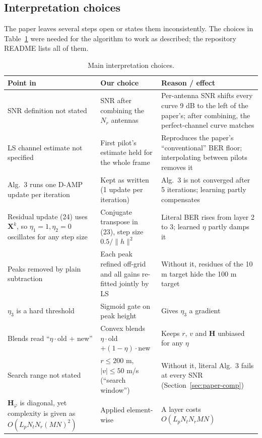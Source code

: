 \documentclass[11pt,a4paper]{article}
\newcommand{\BH}{\mathbf{H}}
\newcommand{\BX}{\mathbf{X}}
\begin{document}
\subsection{Interpretation choices}\label{sec:choices}
The paper leaves several steps open or states them inconsistently. The choices in Table~\ref{tab:choices} were needed for the algorithm to work as described; the repository README lists all of them.

\begin{table}[H]
\centering\small
\begin{tabularx}{\textwidth}{>{\raggedright\arraybackslash}X>{\raggedright\arraybackslash}X>{\raggedright\arraybackslash}X}
\toprule
Point in~\cite{isacnet} & Our choice & Reason / effect \\
\midrule
SNR definition not stated & SNR after combining the $N_r$ antennas & Per-antenna SNR shifts every curve 9 dB to the left of the paper's; after combining, the perfect-channel curve matches \\
LS channel estimate not specified & First pilot's estimate held for the whole frame & Reproduces the paper's ``conventional'' BER floor; interpolating between pilots removes it \\
Alg.~3 runs one D-AMP update per iteration & Kept as written (1 update per iteration) & Alg.~3 is not converged after 5 iterations; learning partly compensates \\
Residual update (24) uses $\BX^k$, so $\eta_1=1,\eta_2=0$ oscillates for any step size & Conjugate transpose in (23), step size $0.5/\|h\|^2$ & Literal BER rises from layer 2 to 3; learned $\eta$ partly damps it \\
Peaks removed by plain subtraction & Each peak refined off-grid and all gains re-fitted jointly by LS & Without it, residues of the 10 m target hide the 100 m target \\
$\eta_3$ is a hard threshold & Sigmoid gate on peak height & Gives $\eta_3$ a gradient \\
Blends read ``$\eta\cdot$old + new'' & Convex blends $\eta\cdot$old $+(1-\eta)\cdot$new & Keeps $r$, $v$ and $\BH$ unbiased for any $\eta$ \\
Search range not stated & $r\le200$ m, $|v|\le50$ m/s (``search window'') & Without it, literal Alg.~3 fails at every SNR (Section~\ref{sec:paper-comp}) \\
$\BH_\varphi$ is diagonal, yet complexity is given as $O(L_pN_tN_r(MN)^2)$ & Applied element-wise & A layer costs $O(L_pN_tN_rMN)$ \\
\bottomrule
\end{tabularx}
\caption{Main interpretation choices.}
\label{tab:choices}
\end{table}
\end{document}
